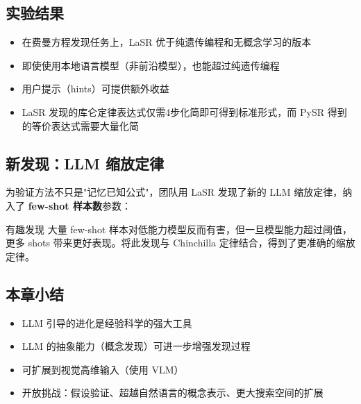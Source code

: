\subsection{实验结果}

\begin{itemize}
    \item 在费曼方程发现任务上，LaSR 优于纯遗传编程和无概念学习的版本
    \item 即使使用本地语言模型（非前沿模型），也能超过纯遗传编程
    \item 用户提示（hints）可提供额外收益
    \item LaSR 发现的库仑定律表达式仅需4步化简即可得到标准形式，而 PySR 得到的等价表达式需要大量化简
\end{itemize}

\subsection{新发现：LLM 缩放定律}

为验证方法不只是"记忆已知公式"，团队用 LaSR 发现了新的 LLM 缩放定律，纳入了 \textbf{few-shot 样本数}参数：

\begin{warningbox}{有趣发现}
大量 few-shot 样本对低能力模型反而有害，但一旦模型能力超过阈值，更多 shots 带来更好表现。将此发现与 Chinchilla 定律结合，得到了更准确的缩放定律。
\end{warningbox}

\subsection{本章小结}

\begin{itemize}
    \item LLM 引导的进化是经验科学的强大工具
    \item LLM 的抽象能力（概念发现）可进一步增强发现过程
    \item 可扩展到视觉高维输入（使用 VLM）
    \item 开放挑战：假设验证、超越自然语言的概念表示、更大搜索空间的扩展
\end{itemize}

